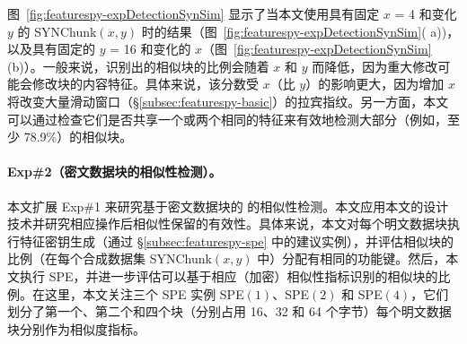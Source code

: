 图~\ref{fig:featurespy-expDetectionSynSim} 显示了当本文使用具有固定 $x$ = 4 和变化 $y$ 的 SYNChunk$(x, y)$ 时的结果（图~\ref{fig:featurespy-expDetectionSynSim}( a))，以及具有固定的 $y$ = 16 和变化的 $x$（图~\ref{fig:featurespy-expDetectionSynSim}(b)）。一般来说，识别出的相似块的比例会随着 $x$ 和 $y$ 而降低，因为重大修改可能会修改块的内容特征。具体来说，该分数受 $x$（比 $y$）的影响更大，因为增加 $x$ 将改变大量滑动窗口（\S\ref{subsec:featurespy-basic}）的拉宾指纹。另一方面，本文可以通过检查它们是否共享一个或两个相同的特征来有效地检测大部分（例如，至少 78.9\%）的相似块。



\paragraph*{Exp\#2（密文数据块的相似性检测）。}
本文扩展 Exp\#1 来研究基于密文数据块的 \sysnameF 的相似性检测。本文应用本文的设计技术并研究相应操作后相似性保留的有效性。具体来说，本文对每个明文数据块执行特征密钥生成（通过 \S\ref{subsec:featurespy-spe} 中的建议实例），并评估相似块的比例（在每个合成数据集 SYNChunk$(x, y)$ 中）分配有相同的功能键。然后，本文执行 SPE，并进一步评估可以基于相应（加密）相似性指标识别的相似块的比例。在这里，本文关注三个 SPE 实例 SPE$(1)$、SPE$(2)$ 和 SPE$(4)$，它们划分了第一个、第二个和四个块（分别占用 16、32 和 64 个字节）每个明文数据块分别作为相似度指标。

